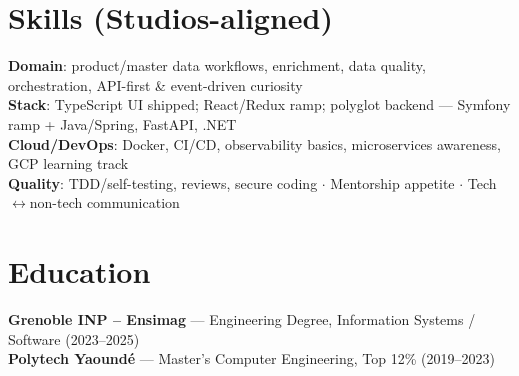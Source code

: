 \documentclass[10pt,a4paper]{article}
\begin{document}
\section{Skills (Studios-aligned)}
\textbf{Domain}: product/master data workflows, enrichment, data quality, orchestration, API-first \& event-driven curiosity\\
\textbf{Stack}: TypeScript UI shipped; React/Redux ramp; polyglot backend --- Symfony ramp + Java/Spring, FastAPI, .NET\\
\textbf{Cloud/DevOps}: Docker, CI/CD, observability basics, microservices awareness, GCP learning track\\
\textbf{Quality}: TDD/self-testing, reviews, secure coding $\cdot$ Mentorship appetite $\cdot$ Tech$\leftrightarrow$non-tech communication

\section{Education}
\textbf{Grenoble INP -- Ensimag} --- Engineering Degree, Information Systems / Software (2023--2025)\\
\textbf{Polytech Yaound\'e} --- Master's Computer Engineering, Top 12\% (2019--2023)
\end{document}

